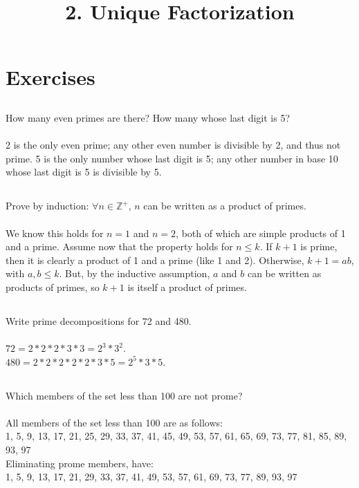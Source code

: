 \documentclass{article}
\begin{document}
\newcommand{\Z}{\mathbb{Z}}

\title{2. Unique Factorization}
\section{Exercises}

\subsection{}
How many even primes are there? How many whose last digit is 5?\\~\\
2 is the only even prime; any other even number is divisible by 2, and thus not prime.
5 is the only number whose last digit is 5; any other number in base 10 whose last
digit is 5 is divisible by 5.

\subsection{}
Prove by induction: $\forall n \in \Z^+$, $n$ can be written as a product of primes.\\~\\
We know this holds for $n = 1$ and $n = 2$, both of which are simple products of 1 and a prime.
Assume now that the property holds for $n \leq k$.
If $k + 1$ is prime, then it is clearly a product of 1 and a prime (like 1 and 2).
Otherwise, $k + 1 = ab$, with $a, b \leq k$.
But, by the inductive assumption, $a$ and $b$ can be written as products of primes,
so $k + 1$ is itself a product of primes.

\subsection{}
Write prime decompositions for 72 and 480.\\~\\
$72 = 2 * 2 * 2 * 3 * 3 = 2^3 * 3^2$.\\
$480 = 2 * 2 * 2 * 2 * 2 * 3 * 5 = 2^5 * 3 * 5$.

\subsection{}
Which members of the set less than 100 are not prome?\\~\\
All members of the set less than 100 are as follows:\\
1, 5, 9, 13, 17, 21, 25, 29, 33, 37, 41, 45, 49, 53, 57, 61, 65, 69, 73, 77, 81, 85, 89, 93, 97\\
Eliminating prome members, have:\\
1, 5, 9, 13, 17, 21, 29, 33, 37, 41, 49, 53, 57, 61, 69, 73, 77, 89, 93, 97
\end{document}
